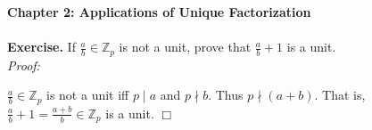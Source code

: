 \documentclass{article}
\begin{document}
\textbf{\Large Chapter 2: Applications of Unique Factorization} \\\\

\textbf{Exercise.} If $\frac{a}{b} \in \mathbb{Z}_{p}$ is not a unit, prove that
$\frac{a}{b} + 1$ is a unit. \\

\emph{Proof:}

$\frac{a}{b} \in \mathbb{Z}_{p}$ is not a unit iff $p \mid a$ and $p \nmid b$.
Thus $p \nmid (a +b)$. That is, $\frac{a}{b} + 1 = \frac{a + b}{b} \in \mathbb{Z}_{p}$ is a unit.
$\Box$
\end{document}
